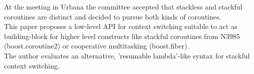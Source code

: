 At the meeting in Urbana the committee accepted that stackless and stackful
coroutines are distinct and decided to pursue both kinds of coroutines.\\
This paper proposes a low-level API for context switching suitable to act as 
building-block for higher level constructs like stackful coroutines from
N3985\cite{N3985} (boost.coroutine2\cite{bcoroutine2}) or cooperative
multitasking (boost.fiber\cite{bfiber}).\\
The author evaluates an alternative, 'resumable lambda'-like syntax for
stackful context switching.
